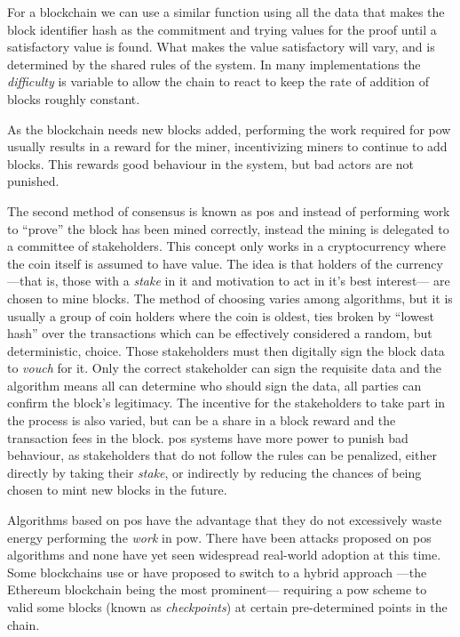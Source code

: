 For a blockchain we can use a similar function using all the data that makes the block identifier hash as the commitment and trying values for the proof until a satisfactory value is found. What makes the value satisfactory will vary, and is determined by the shared rules of the system. In many implementations the \emph{difficulty} is variable to allow the chain to react to keep the rate of addition of blocks roughly constant.

As the blockchain needs new blocks added, performing the work required for \gls{pow} usually results in a reward for the miner, incentivizing miners to continue to add blocks. This rewards good behaviour in the system, but bad actors are not punished.

The second method of consensus is known as \gls{pos} and instead of performing work to ``prove'' the block has been mined correctly, instead the mining is delegated to a committee of stakeholders. This concept only works in a cryptocurrency where the coin itself is assumed to have value. The idea is that holders of the currency ---that is, those with a \emph{stake} in it and motivation to act in it's best interest--- are chosen to mine blocks. The method of choosing varies among algorithms, but it is usually a group of coin holders where the coin is oldest, ties broken by ``lowest hash'' over the transactions which can be effectively considered a random, but deterministic, choice. Those stakeholders must then digitally sign the block data to \emph{vouch} for it. Only the correct stakeholder can sign the requisite data and the algorithm means all can determine who should sign the data, all parties can confirm the block's legitimacy. The incentive for the stakeholders to take part in the process is also varied, but can be a share in a block reward and the transaction fees in the block. \Gls{pos} systems have more power to punish bad behaviour, as stakeholders that do not follow the rules can be penalized, either directly by taking their \emph{stake}, or indirectly by reducing the chances of being chosen to mint new blocks in the future.

Algorithms based on \gls{pos} have the advantage that they do not excessively waste energy performing the \emph{work} in \gls{pow}. There have been attacks proposed on \gls{pos} algorithms \cite{gaziStakeBleedingAttacksProofofStake2018} and none have yet seen widespread real-world adoption at this time. Some blockchains use \cite{mackenzieMEMCOIN2HYBRIDPROOFOFWORK} or have proposed to switch to \cite{buterinCasperFriendlyFinality2019} a hybrid approach ---the Ethereum blockchain being the most prominent--- requiring a \gls{pow} scheme to valid some blocks (known as \emph{checkpoints}) at certain pre-determined points in the chain.

